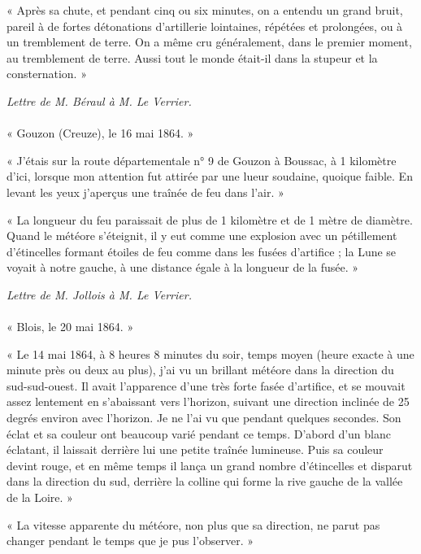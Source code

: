 \documentclass[a4paper, 11pt, oneside, polutonikogreek, french]{article}
\begin{document}
« Après sa chute, et pendant cinq ou six minutes, on a entendu un grand bruit, pareil à de fortes détonations d'artillerie lointaines, répétées et prolongées, ou à un tremblement de terre. On a même cru généralement, dans le premier moment, au tremblement de terre. Aussi tout le monde était-il dans la stupeur et la consternation. »
\begin{center}
\emph{Lettre de M. Béraul à M. Le Verrier.}
\end{center}
\paragraph{}
« Gouzon (Creuze), le 16 mai 1864. »

« J'étais sur la route départementale n° 9 de Gouzon à Boussac, à 1 kilomètre d'ici, lorsque mon attention fut attirée par une lueur soudaine, quoique faible. En levant les yeux j'aperçus une traînée de feu dans l'air. »

« La longueur du feu paraissait de plus de 1 kilomètre et de 1 mètre de diamètre. Quand le météore s'éteignit, il y eut comme une explosion avec un pétillement d'étincelles formant étoiles de feu comme dans les fusées d'artifice ; la Lune se voyait à notre gauche, à une distance égale à la longueur de la fusée. »
\begin{center}
\emph{Lettre de M. Jollois à M. Le Verrier.}
\end{center}
\paragraph{}
« Blois, le 20 mai 1864. »

« Le 14 mai 1864, à 8 heures 8 minutes du soir, temps moyen (heure exacte à une minute près ou deux au plus), j'ai vu un brillant météore dans la direction du sud-sud-ouest. Il avait l'apparence d'une très forte fasée d'artifice, et se mouvait assez lentement en s'abaissant vers l'horizon, suivant une direction inclinée de 25 degrés environ avec l'horizon. Je ne l'ai vu que pendant quelques secondes. Son éclat et sa couleur ont beaucoup varié pendant ce temps. D'abord d'un blanc éclatant, il laissait derrière lui une petite traînée lumineuse. Puis sa couleur devint rouge, et en même temps il lança un grand nombre d'étincelles et disparut dans la direction du sud, derrière la colline qui forme la rive gauche de la vallée de la Loire. »
 
« La vitesse apparente du météore, non plus que sa direction, ne parut pas changer pendant le temps que je pus l'observer. »
\clearpage
\end{document}
